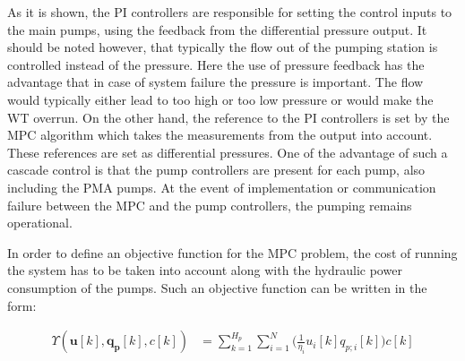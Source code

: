 As it is shown, the PI controllers are responsible for setting the control inputs to the main pumps, using the feedback from the differential pressure output. It should be noted however, that typically the flow out of the pumping station is controlled instead of the pressure. Here the use of pressure feedback has the advantage that in case of system failure the pressure is important. The flow would typically either lead to too high or too low pressure or would make the WT overrun. On the other hand, the reference to the PI controllers is set by the MPC algorithm which takes the measurements from the output into account. These references are set as differential pressures. One of the advantage of such a cascade control is that the pump controllers are present for each pump, also including the PMA pumps. At the event of implementation or communication failure between the MPC and the pump controllers, the pumping remains operational. 
 



In order to define an objective function for the MPC problem, the cost of running the system has to be taken into account along with the hydraulic power consumption of the pumps. Such an objective function can be written in the form: 

\begin{align}
 \Upsilon(\pmb{u}[k],\pmb{q_p}[k],c[k]) &=  \sum_{k=1}^{H_p} \sum_{i=1}^{N} \Big(\frac{1}{\eta_i} u_i[k]  q_{p;i}[k]\Big) c[k] \label{eqcost} 
\end{align}


